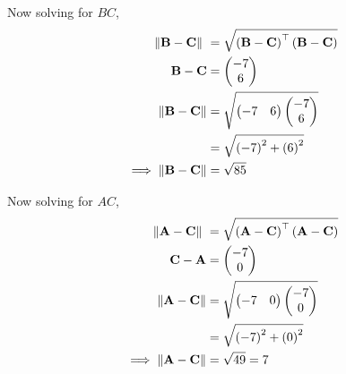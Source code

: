 \documentclass[11pt]{book}
\begin{document}
\begin{enumerate}[label=\thesection.\arabic*.,ref=\thesection.\theenumi]
Now solving for $BC$,\\
\begin{align}
	\norm{\vec{B}-\vec{C}}\ &=  \sqrt{\brak{\vec{B}-\vec{C}}^{\top}\brak{\vec{B}-\vec{C}}} \\
\vec{B}-\vec{C} &= \myvec{-7\\6}\\
\norm{\vec{B}-\vec{C}} &= \sqrt{\myvec{-7 & 6}\myvec{-7\\6}}\\
&= \sqrt{\brak{-7}^2+\brak{6}^2}\\
\implies \norm{\vec{B}-\vec{C}} &= \sqrt{85}
\end{align}

Now solving for $AC$,\\
\begin{align}
	\norm{\vec{A}-\vec{C}}\ &=  \sqrt{\brak{\vec{A}-\vec{C}}^{\top}\brak{\vec{A}-\vec{C}}} \\
\vec{C}-\vec{A} &= \myvec{-7\\0}\\
\norm{\vec{A}-\vec{C}} &= \sqrt{\myvec{-7 & 0}\myvec{-7 \\ 0}}\\
&= \sqrt{\brak{-7}^2+\brak{0}^2}\\
\implies \norm{\vec{A}-\vec{C}}&=\sqrt{49} =7
\end{align}


\end{enumerate}
\end{document}
